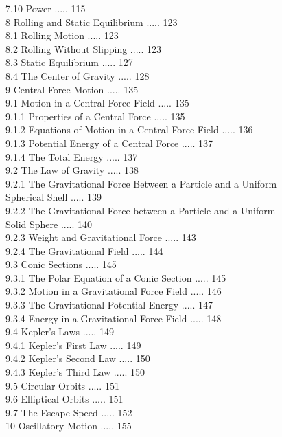 \documentclass[10pt]{article}
\begin{document}
7.10 Power ..... 115\\
8 Rolling and Static Equilibrium ..... 123\\
8.1 Rolling Motion ..... 123\\
8.2 Rolling Without Slipping ..... 123\\
8.3 Static Equilibrium ..... 127\\
8.4 The Center of Gravity ..... 128\\
9 Central Force Motion ..... 135\\
9.1 Motion in a Central Force Field ..... 135\\
9.1.1 Properties of a Central Force ..... 135\\
9.1.2 Equations of Motion in a Central Force Field ..... 136\\
9.1.3 Potential Energy of a Central Force ..... 137\\
9.1.4 The Total Energy ..... 137\\
9.2 The Law of Gravity ..... 138\\
9.2.1 The Gravitational Force Between a Particle and a Uniform\\
Spherical Shell ..... 139\\
9.2.2 The Gravitational Force between a Particle and a Uniform\\
Solid Sphere ..... 140\\
9.2.3 Weight and Gravitational Force ..... 143\\
9.2.4 The Gravitational Field ..... 144\\
9.3 Conic Sections ..... 145\\
9.3.1 The Polar Equation of a Conic Section ..... 145\\
9.3.2 Motion in a Gravitational Force Field ..... 146\\
9.3.3 The Gravitational Potential Energy ..... 147\\
9.3.4 Energy in a Gravitational Force Field ..... 148\\
9.4 Kepler's Laws ..... 149\\
9.4.1 Kepler's First Law ..... 149\\
9.4.2 Kepler's Second Law ..... 150\\
9.4.3 Kepler's Third Law ..... 150\\
9.5 Circular Orbits ..... 151\\
9.6 Elliptical Orbits ..... 151\\
9.7 The Escape Speed ..... 152\\
10 Oscillatory Motion ..... 155\\
\end{document}
